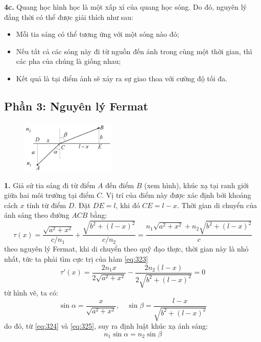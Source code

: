 \noindent\textbf{4c.} Quang học hình học là một xấp xỉ của quang học sóng. Do đó, nguyên lý đẳng thời có thể được giải thích như sau:
\begin{itemize}
  \item Mỗi tia sáng có thể tương ứng với một sóng nào đó;
  \item  Nếu tất cả các sóng này đi từ nguồn đến ảnh trong cùng một thời gian, thì các pha của chúng là giống nhau;
  \item  Kết quả là tại điểm ảnh sẽ xảy ra sự giao thoa với cường độ tối đa.
\end{itemize}

\subsection*{Phần 3: Nguyên lý Fermat}
\begin{figure}
  \centering
  \vspace{-12mm}
  \includegraphics[width=0.4\textwidth]{Figures/P3/Fig 3.5S.png}
\end{figure}

\noindent\textbf{1.} Giả sử tia sáng đi từ điểm $A$ đến điểm $B$ (xem hình), khúc xạ tại ranh giới giữa hai môi trường tại điểm $C$. Vị trí của điểm này được xác định bởi khoảng cách $x$ tính từ điểm $D$. Đặt $DE=l$, khi đó $CE=l-x$. Thời gian di chuyển của ánh sáng theo đường $ACB$ bằng:
\begin{equation}
  \label{eq:323}
  \tau(x)=\frac{\sqrt{a^{2}+x^{2}}}{c/n_{1}}+\frac{\sqrt{b^{2}+(l-x)^{2}}}{c/n_{2}}=\frac{n_{1}\sqrt{a^{2}+x^{2}}+n_{2}\sqrt{b^{2}+(l-x)^{2}}}{c}
\end{equation}
theo nguyên lý Fermat, khi di chuyển theo quỹ đạo thực, thời gian này là nhỏ nhất, tức ta phải tìm cực trị của hàm \eqref{eq:323}
\begin{equation}
  \label{eq:324}
  \tau'(x)=\frac{2n_{1}x}{2\sqrt{a^{2}+x^{2}}}-\frac{2n_{2}(l-x)}{2\sqrt{b^{2}+(l-x)^{2}}}=0
\end{equation}
từ hình vẽ, ta có:
\begin{equation}
  \label{eq:325}
  \sin{\alpha}=\frac{x}{\sqrt{a^{2}+x^{2}}}, \quad \sin{\beta}=\frac{l-x}{\sqrt{b^{2}+(l-x)^{2}}}
\end{equation}
do đó, từ \eqref{eq:324} và \eqref{eq:325}, suy ra định luật khúc xạ ánh sáng:
\begin{equation}
  \label{eq:326}
  n_{1}\sin{\alpha}=n_{2}\sin{\beta}
\end{equation}

